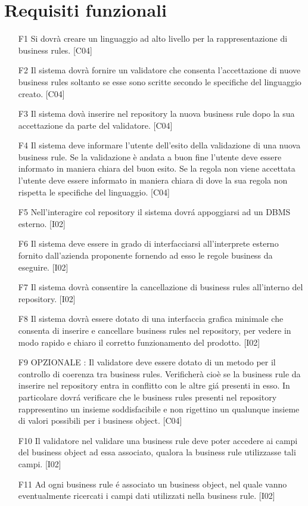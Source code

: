 \documentclass[11pt,titlepage,a4paper]{report}
\begin{document}
\section{Requisiti funzionali}
\begin{itemize}
\item[F1]{Si dovr\`a creare un linguaggio ad alto livello per la rappresentazione di business rules. [C04]}
\item[F2]{Il sistema dovr\`a fornire un validatore che consenta l'accettazione di nuove business rules soltanto se esse sono scritte secondo le specifiche del linguaggio creato. [C04]}
\item[F3]{Il sistema dov\`a inserire nel repository la nuova business rule dopo la sua accettazione da parte del validatore. [C04]}
\item[F4]{Il sistema deve informare l'utente dell'esito della validazione di una nuova business rule. Se la validazione \`e andata a buon fine l'utente deve essere informato in maniera chiara del buon esito. Se la regola non viene accettata l'utente deve essere informato in maniera chiara di dove la sua regola non rispetta le specifiche del linguaggio. [C04]}
\item[F5]{Nell'interagire col repository il sistema dovr\'a appoggiarsi ad un DBMS esterno. [I02]}
\item[F6]{Il sistema deve essere in grado di interfacciarsi all'interprete esterno fornito dall'azienda proponente fornendo ad esso le regole business da eseguire. [I02]}
\item[F7]{Il sistema dovr\`a consentire la cancellazione di business rules all'interno del repository. [I02]}
\item[F8]{Il sistema dovr\`a essere dotato di una interfaccia grafica minimale che consenta di inserire e cancellare business rules nel repository, per  vedere in modo rapido e chiaro il corretto funzionamento del prodotto. [I02]}
\item[F9]{ OPZIONALE : Il validatore deve essere dotato di un metodo per il controllo di coerenza tra business rules. Verificher\`a cio\`e se la business rule da inserire nel repository entra in conflitto con le altre gi\'a presenti in esso. In particolare dovr\'a verificare che le business rules presenti nel repository rappresentino un insieme soddisfacibile e non rigettino un qualunque insieme di valori possibili per i business object. [C04]}
\item[F10]{Il validatore nel validare una business rule deve poter accedere ai campi del business object ad essa associato, qualora la business rule utilizzasse tali campi. [I02]}
\item[F11]{Ad ogni business rule \'e associato un business object, nel quale vanno eventualmente ricercati i campi dati utilizzati nella business rule. [I02]}
\end{itemize}
\end{document}
